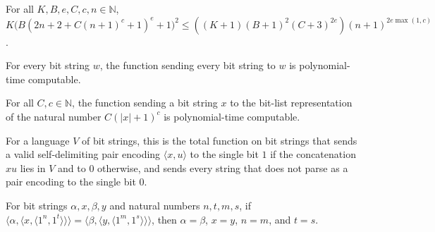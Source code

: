 \begin{lemma}
\label{Complexity.tmsat_deadline_bound}
\leanok
{}
For all $K,B,e,C,c,n\in\mathbb{N}$, $K\bigl(B(2n+2+C(n+1)^c+1)^e+1\bigr)^2\le
((K+1)(B+1)^2(C+3)^{2e})(n+1)^{2e\max(1,c)}$.
\end{lemma}

\begin{lemma}
\label{Complexity.tmsat_constant_poly}
\leanok
{}
For every bit string $w$, the function sending every bit string to $w$ is
polynomial-time computable.
\end{lemma}

\begin{lemma}
\label{Complexity.tmsat_exact_certificate_bits}
\leanok
{}
For all $C,c\in\mathbb{N}$, the function sending a bit string $x$ to the bit-list
representation of the natural number $C(|x|+1)^c$ is polynomial-time computable.
\end{lemma}

\begin{definition}
\label{Complexity.tmsatWrapperOutput}
\leanok
{}
For a language $V$ of bit strings, this is the total function on bit strings that sends a valid self-delimiting pair encoding $\langle x,u\rangle$ to the single bit $1$ if the concatenation $xu$ lies in $V$ and to $0$ otherwise, and sends every string that does not parse as a pair encoding to the single bit $0$.
\end{definition}

\begin{lemma}
\label{Complexity.tmsat_quad_injective}
\leanok
{}
For bit strings $\alpha,x,\beta,y$ and natural numbers $n,t,m,s$, if
$\langle\alpha,\langle x,\langle 1^n,1^t\rangle\rangle\rangle=\langle\beta,\langle
y,\langle 1^m,1^s\rangle\rangle\rangle$, then $\alpha=\beta$, $x=y$, $n=m$, and $t=s$.
\end{lemma}

